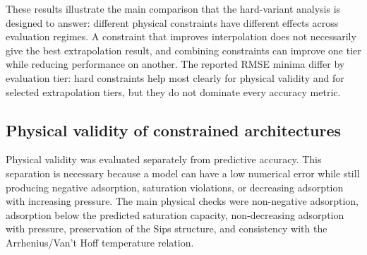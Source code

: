 \documentclass[11pt]{article}
\begin{document}
These results illustrate the main comparison that the hard-variant analysis is
designed to answer: different physical constraints have different effects across
evaluation regimes. A constraint that improves interpolation does not
necessarily give the best extrapolation result, and combining constraints can
improve one tier while reducing performance on another. The reported RMSE
minima differ by evaluation tier: hard constraints help most clearly for
physical validity and for selected extrapolation tiers, but they do not dominate
every accuracy metric.

\subsection{Physical validity of constrained architectures}

Physical validity was evaluated separately from predictive accuracy. This
separation is necessary because a model can have a low numerical error while
still producing negative adsorption, saturation violations, or decreasing
adsorption with increasing pressure. The main physical checks were non-negative
adsorption, adsorption below the predicted saturation capacity, non-decreasing
adsorption with pressure, preservation of the Sips structure, and consistency
with the Arrhenius/Van't Hoff temperature relation.
\end{document}
